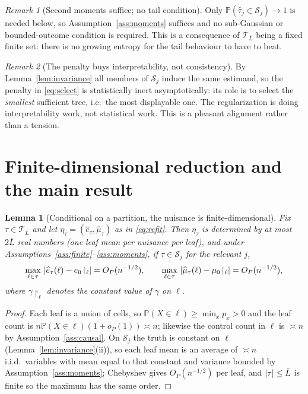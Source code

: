 \documentclass[11pt]{article}
\theoremstyle{plain}
\newtheorem{lemma}{Lemma}
\theoremstyle{definition}
\theoremstyle{remark}
\newtheorem{remark}{Remark}
\newcommand{\PP}{\mathbb{P}}
\newcommand{\cT}{\mathcal{T}}
\newcommand{\cS}{\mathcal{S}}
\newcommand{\ez}{e_0}
\newcommand{\mz}{\mu_0}
\newcommand{\ehat}{\widehat{e}}
\newcommand{\mhat}{\widehat{\mu}}
\newcommand{\that}{\widehat{\tau}}
\DeclarePairedDelimiter{\abs}{\lvert}{\rvert}
\DeclarePairedDelimiter{\card}{\lvert}{\rvert}
\begin{document}
\begin{remark}[Second moments suffice; no tail condition]\label{rem:no-tails}
Only $\PP(\that_j\in\cS_j)\to1$ is needed below, so
Assumption~\ref{ass:moments} suffices and no sub-Gaussian or bounded-outcome
condition is required. This is a consequence of $\cT_{\bar L}$ being a fixed
finite set: there is no growing entropy for the tail behaviour to have to beat.
\end{remark}

\begin{remark}[The penalty buys interpretability, not consistency]\label{rem:penalty}
By Lemma~\ref{lem:invariance} all members of $\cS_j$ induce the same estimand, so
the penalty in \eqref{eq:select} is statistically inert asymptotically: its role
is to select the \emph{smallest} sufficient tree, i.e.\ the most displayable one.
The regularization is doing interpretability work, not statistical work. This is
a pleasant alignment rather than a tension.
\end{remark}

\section{Finite-dimensional reduction and the main result}

\begin{lemma}[Conditional on a partition, the nuisance is
finite-dimensional]\label{lem:findim}
Fix $\tau\in\cT_{\bar L}$ and let $\eta_\tau=(\ehat_\tau,\mhat_\tau)$ as in
\eqref{eq:refit}. Then $\eta_\tau$ is determined by at most $2\bar L$ real
numbers (one leaf mean per nuisance per leaf), and under
Assumptions~\ref{ass:finite}--\ref{ass:moments}, if $\tau\in\cS_j$ for the
relevant $j$,
\[
  \max_{\ell\in\tau}\ \abs{\ehat_\tau(\ell)-\ez\!\restriction_\ell} = O_P(n^{-1/2}),
  \qquad
  \max_{\ell\in\tau}\ \abs{\mhat_\tau(\ell)-\mz\!\restriction_\ell} = O_P(n^{-1/2}),
\]
where $\gamma\!\restriction_\ell$ denotes the constant value of $\gamma$ on
$\ell$.
\end{lemma}

\begin{proof}
Each leaf is a union of cells, so $\PP(X\in\ell)\ge\min_x p_x>0$ and the leaf
count is $n\PP(X\in\ell)(1+o_P(1))\asymp n$; likewise the control count in
$\ell$ is $\asymp n$ by Assumption~\ref{ass:causal}. On $\cS_j$ the truth is
constant on $\ell$ (Lemma~\ref{lem:invariance}(ii)), so each leaf mean is an
average of $\asymp n$ i.i.d.\ variables with mean equal to that constant and
variance bounded by Assumption~\ref{ass:moments}; Chebyshev gives $O_P(n^{-1/2})$
per leaf, and $\card{\tau}\le\bar L$ is finite so the maximum has the same order.
\end{proof}
\end{document}
